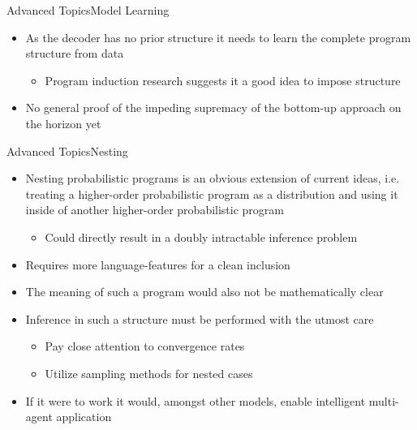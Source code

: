 \documentclass[AERbeamer%
              ,optEnglish%
              ,optBiber%
              ,optBibstyleAlphabetic%
              ,optBeamerClassicFormat%
              ]{AERlatex}%
\begin{document}
\begin{frame}[c]{Advanced Topics}{Model Learning}
    \centering
    \begin{itemize}
        \item As the decoder has no prior structure it needs to learn the complete program structure from data
        \begin{itemize}
            \item Program induction research suggests it a good idea to impose structure
        \end{itemize}
        \item No general proof of the impeding supremacy of the bottom-up approach on the horizon yet
    \end{itemize}
\end{frame}



\begin{frame}[c]{Advanced Topics}{Nesting}
    \centering
    \begin{itemize}
        \item Nesting probabilistic programs is an obvious extension of current ideas, i.e.
              treating a higher-order probabilistic program as a distribution and using it
              inside of another higher-order probabilistic program
        \begin{itemize}
            \item Could directly result in a doubly intractable inference problem
        \end{itemize}
        \item Requires more language-features for a clean inclusion
        \item The meaning of such a program would also not be mathematically clear
        \item Inference in such a structure must be performed with the utmost care
        \begin{itemize}
            \item Pay close attention to convergence rates
            \item Utilize sampling methods for nested cases
        \end{itemize}
        \item If it were to work it would, amongst other models, enable intelligent multi-agent application
    \end{itemize}
\end{frame}
\end{document}
